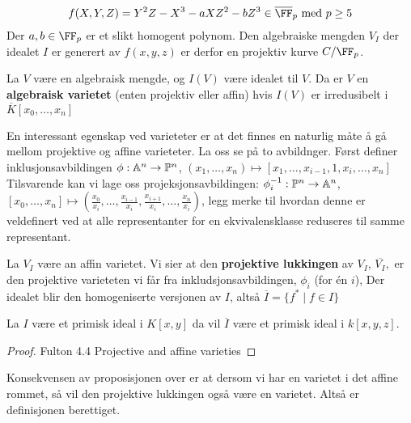\begin{eksempel}
\label{Elliptisk projektiv kurve}
\begin{equation}
    \label{Elliptisk kurve equation}
    f(X,Y,Z) = Y^2Z - X^3 - aXZ^2 - bZ^3 \in \overline{\FF}_p \text{ med } p \geq 5
\end{equation} 
Der $a, b \in \FF_p$ er et slikt homogent polynom. Den algebraiske mengden $V_I$ der idealet $I$ er generert av $f(x,y,z)$ er derfor en projektiv kurve $C/\FF_p$.
\end{eksempel}

\begin{definisjon}
La $V$ være en algebraisk mengde, og $I(V)$ være idealet til $V$. Da er $V$ en \textbf{algebraisk varietet} (enten projektiv eller affin) hvis $I(V)$ er irredusibelt i $\overline{K}[x_0, \ldots, x_n]$
\end{definisjon}

En interessant egenskap ved varieteter er at det finnes en naturlig måte å gå mellom projektive og affine varieteter. La oss se på to avbildnger. Først definer inklusjonsavbildingen $\phi: \mathbb{A}^n \rightarrow \mathbb{P}^n$, $(x_1, \ldots, x_n) \mapsto [x_1, \ldots, x_{i-1}, 1, x_i, \ldots, x_n]$ 
Tilsvarende kan vi lage oss projeksjonsavbildingen: $\phi_i^{-1} : \mathbb{P} ^n \rightarrow \mathbb{A}^n$, $ [x_0, \ldots, x_n] \mapsto (\frac{x_0}{x_i}, \ldots, \frac{x_{i-1}}{x_i}, \frac{x_{i+1}}{x_i}, \ldots, \frac{x_n}{x_i})$, legg merke til hvordan denne er veldefinert ved at alle representanter for en ekvivalensklasse reduseres til samme representant.

\begin{definisjon}
La $V_I$ være an affin varietet. Vi sier at den \textbf{projektive lukkingen} av $V_I$, $\overline{V_I},$ er den projektive varieteten vi får fra inkludsjonsavbildingen, $\phi_i$ (for én $i$), Der idealet blir den homogeniserte versjonen av $I$, altså $\overline{I} = \{f^* \mid f \in I \}$
\end{definisjon}

\begin{proposisjon}
La $I$ være et primisk ideal i $K[x,y]$ da vil $\overline{I}$ være et primisk ideal i $k[x,y,z]$. 
\begin{proof}
Fulton 4.4 Projective and affine varieties
\end{proof}
\end{proposisjon}

Konsekvensen av proposisjonen over er at dersom vi har en varietet i det affine rommet, så vil den projektive lukkingen også være en varietet. Altså er definisjonen berettiget.


